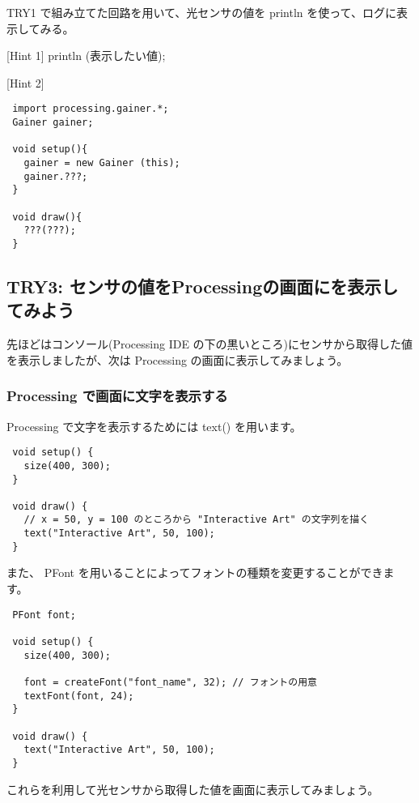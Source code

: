 \documentclass[11pt,a4paper]{jarticle}
\begin{document}
TRY1 で組み立てた回路を用いて、光センサの値を println を使って、ログに表示してみる。

[Hint 1]
println (表示したい値);

[Hint 2]

\begin{lstlisting}
 import processing.gainer.*;
 Gainer gainer;

 void setup(){
   gainer = new Gainer (this);
   gainer.???;
 }

 void draw(){
   ???(???);
 }
\end{lstlisting}


\subsection*{TRY3: センサの値をProcessingの画面にを表示してみよう}
先ほどはコンソール(Processing IDE の下の黒いところ)にセンサから取得した値を表示しましたが、次は Processing の画面に表示してみましょう。

\subsubsection*{Processing で画面に文字を表示する}
Processing で文字を表示するためには text() を用います。
\begin{lstlisting}
 void setup() {
   size(400, 300);
 }

 void draw() {
   // x = 50, y = 100 のところから "Interactive Art" の文字列を描く
   text("Interactive Art", 50, 100);
 }
\end{lstlisting}

また、 PFont を用いることによってフォントの種類を変更することができます。
\begin{lstlisting}
 PFont font;

 void setup() {
   size(400, 300);
 
   font = createFont("font_name", 32); // フォントの用意
   textFont(font, 24);
 }

 void draw() {
   text("Interactive Art", 50, 100);
 }
\end{lstlisting}

これらを利用して光センサから取得した値を画面に表示してみましょう。


  
\end{document}

